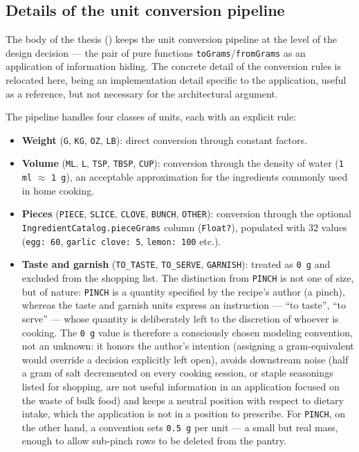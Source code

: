 \subsection{Details of the unit conversion pipeline}\label{anexa:grams-detail}

The body of the thesis () keeps the unit conversion pipeline at the level of the design decision --- the pair of pure functions \texttt{toGrams}/\texttt{fromGrams} as an application of information hiding. The concrete detail of the conversion rules is relocated here, being an implementation detail specific to the application, useful as a reference, but not necessary for the architectural argument.

The pipeline handles four classes of units, each with an explicit rule:

\begin{itemize}
  \item \textbf{Weight} (\texttt{G}, \texttt{KG}, \texttt{OZ}, \texttt{LB}): direct conversion through constant factors.
  \item \textbf{Volume} (\texttt{ML}, \texttt{L}, \texttt{TSP}, \texttt{TBSP}, \texttt{CUP}): conversion through the density of water (\texttt{1 ml} \(\approx\) \texttt{1 g}), an acceptable approximation for the ingredients commonly used in home cooking.
  \item \textbf{Pieces} (\texttt{PIECE}, \texttt{SLICE}, \texttt{CLOVE}, \texttt{BUNCH}, \texttt{OTHER}): conversion through the optional \texttt{IngredientCatalog.\allowbreak pieceGrams} column (\texttt{Float?}), populated with 32 values (\texttt{egg: 60}, \texttt{garlic clove: 5}, \texttt{lemon: 100} etc.).
  \item \textbf{Taste and garnish} (\texttt{TO\_TASTE}, \texttt{TO\_SERVE}, \texttt{GARNISH}): treated as \texttt{0 g} and excluded from the shopping list. The distinction from \texttt{PINCH} is not one of size, but of nature: \texttt{PINCH} is a quantity specified by the recipe's author (a pinch), whereas the taste and garnish units express an instruction --- “to taste”, “to serve” --- whose quantity is deliberately left to the discretion of whoever is cooking. The \texttt{0 g} value is therefore a consciously chosen modeling convention, not an unknown: it honors the author's intention (assigning a gram-equivalent would override a decision explicitly left open), avoids downstream noise (half a gram of salt decremented on every cooking session, or staple seasonings listed for shopping, are not useful information in an application focused on the waste of bulk food) and keeps a neutral position with respect to dietary intake, which the application is not in a position to prescribe. For \texttt{PINCH}, on the other hand, a convention sets \texttt{0.5 g} per unit --- a small but real mass, enough to allow sub-pinch rows to be deleted from the pantry.
\end{itemize}


